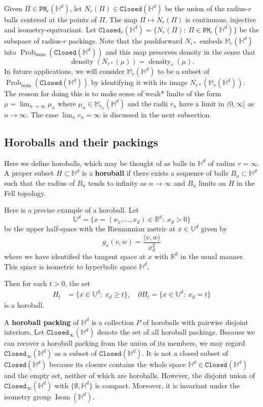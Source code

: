 \documentclass[11pt]{amsart}
\theoremstyle{definition}
\theoremstyle{remark}
\renewcommand{\H}{\mathbb{H}}
\newcommand{\R}{\mathbb{R}}
\newcommand{\M}{\mathbb{M}}
\newcommand{\cP}{\mathtt{PM}}
\newcommand{\Closed}{\mathtt{Closed}}
\newcommand{\isom}{\operatorname{isom}}
\newcommand{\Isom}{\operatorname{Isom}}
\newcommand{\density}{\operatorname{density}}
\newcommand{\Prob}{\operatorname{Prob}}
\begin{document}
Given $\Pi \in \cP_r(\H^d)$, let $N_r(\Pi) \in \Closed(\H^d)$ be the union of the radius-$r$ balls centered at the points of $\Pi$. The map $\Pi \mapsto N_r(\Pi)$ is continuous, injective and isometry-equivariant. Let $\Closed_r(\H^d) =\{N_r(\Pi):~\Pi \in \cP_r(\H^d)\}$ be the subspace of radius-$r$ packings. Note that the pushforward $N_{r*}$ embeds $\M_r(\H^d)$ into  $\Prob_{\isom}(\Closed(\H^d))$ and this map preserves density in the sense that
$$\density(N_{r*}(\mu)) = \density_r(\mu).$$
In future applications, we will consider $\M_r(\H^d)$ to be a subset of $\Prob_{\isom}(\Closed(\H^d))$ by identifying it with its image $N_{r*}(\M_r(\H^d))$. The reason for doing this is to make sense of weak* limits of the form $\mu = \lim_{n\to\infty} \mu_n$ where $\mu_n \in \M_{r_n}(\H^d)$ and the radii $r_n$ have a limit in $(0,\infty]$ as $n\to\infty$. The case $\lim_n r_n = \infty$ is discussed in the next subsection. 









\subsection{Horoballs and their packings} \label{sec:horoballs}

Here we define horoballs, which may be thought of as balls in $\H^d$ of radius $r = \infty$.  
A proper subset $H \subset \H^d$ is a \textbf{horoball} if there exists a sequence of balls $B_n \subset \H^d$ such that the radius of $B_n$ tends to infinity as $n\to\infty$ and $B_n$ limits on $H$ in the Fell topology. 


Here is a precise example of a horoball. Let
$$\mathbb{U}^d=\{x=(x_1,\ldots, x_d) \in \R^d:~ x_d>0\}$$
be the upper half-space with the Riemannian metric at $x\in \mathbb{U}^d$ given by
$$g_x(v,w) = \frac{\langle v,w \rangle}{x_d^2}$$
where we have identified the tangent space at $x$ with $\R^d$ in the usual manner. This space is isometric to hyperbolic space $\H^d$. 

Then for each $t>0$, the set 
\begin{align*}
    H_t&=\{x\in \mathbb{U}^d:~x_d \ge t\}, \quad
    \partial  H_t=\{x\in \mathbb{U}^d:~x_d = t\}
\end{align*}
is a horoball.


A \textbf{horoball packing} of $\H^d$ is a collection $P$ of horoballs with pairwise disjoint interiors. Let $\Closed_\infty(\H^d)$ denote the set of all horoball packings. Because we can recover a horoball packing from the union of its members, we may regard $\Closed_\infty(\H^d)$ as a subset of $\Closed(\H^d)$. It is not a closed subset of $\Closed(\H^d)$ because its closure contains the whole space $\H^d \in \Closed(\H^d)$ and the empty set, neither of which are  horoballs. However, the disjoint union of $\Closed_\infty(\H^d)$ with $\{\emptyset, \H^d\}$ is compact. Moreover, it is invariant under the isometry group $\Isom(\H^d)$. 
\end{document}
